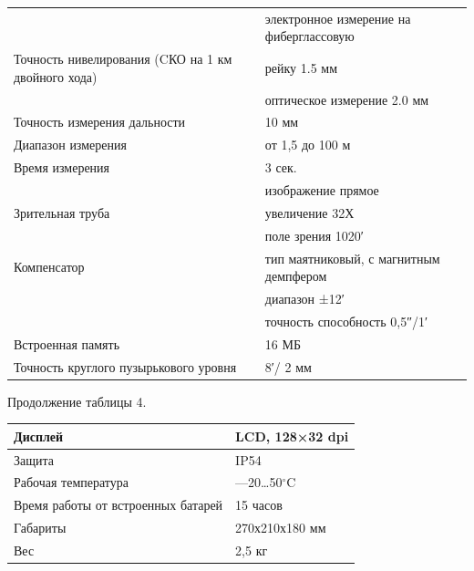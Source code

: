 \documentclass[a4paper]{article}
\begin{document}
\begin{newpage}
\begin{center}
            \begin{tabular}{ | p{200pt} | l | }
                \hline
                 & электронное измерение на фиберглассовую\\
                Точность нивелирования (CКО на 1 км двойного хода) & рейку 1.5 мм\\
                \cline{2-2}
                 & оптическое измерение 2.0 мм\\
                \hline
                Точность измерения дальности & 10 мм\\
                \hline
                Диапазон измерения & от 1,5 до 100 м\\
                \hline
                Время измерения & 3 сек.\\
                \hline
                 & изображение прямое\\
                \cline{2-2}
                Зрительная труба & увеличение 32Х\\
                \cline{2-2}
                 & поле зрения 1020′\\
                \hline
                Компенсатор & тип маятниковый, с магнитным демпфером\\
                \hline
                 & диапазон ±12′\\
                 \hline
                 & точность способность 0,5″/1′\\
                \hline
                Встроенная память & 16 МБ\\
                \hline
                Точность круглого пузырькового уровня & 8′/ 2 мм\\
                \hline
            \end{tabular}
    \end{center}
        
\end{newpage}

\begin{newpage}

        \begin{center}
            \begin{flushleft}
                Продолжение таблицы 4.
            \end{flushleft}
            \begin{tabular}{ | p{200pt} | p{260pt} | }
                \hline
                Дисплей & LCD, 128×32 dpi\\
                \hline
                Защита & IP54\\
                \hline
                Рабочая температура & —20…50$^\circ$C\\
                \hline
                Время работы от встроенных батарей & 15 часов\\
                \hline
                Габариты & 270х210х180 мм\\
                \hline
                Вес & 2,5 кг\\
                \hline
            \end{tabular}
    \end{center}
        
\end{newpage}
\end{document}
